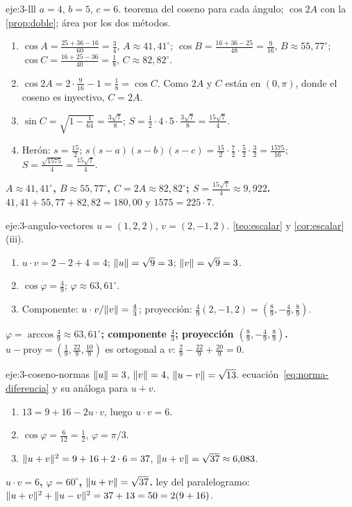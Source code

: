 \begin{solucion}{eje:3-lll}
\datos $a=4$, $b=5$, $c=6$.
\planteamiento teorema del coseno para cada ángulo; $\cos2A$ con la \cref{prop:doble}; área por los dos métodos.
\pasos
\begin{enumerate}[label=\arabic*.]
  \item $\cos A=\frac{25+36-16}{60}=\frac34$, $A\approx41{,}41^{\circ}$; $\cos B=\frac{16+36-25}{48}=\frac{9}{16}$, $B\approx55{,}77^{\circ}$; $\cos C=\frac{16+25-36}{40}=\frac18$, $C\approx82{,}82^{\circ}$.
  \item $\cos2A=2\cdot\frac{9}{16}-1=\frac18=\cos C$. Como $2A$ y $C$ están en $(0,\pi)$, donde el coseno es inyectivo, $C=2A$.
  \item $\sin C=\sqrt{1-\frac1{64}}=\frac{3\sqrt7}{8}$; $S=\frac12\cdot4\cdot5\cdot\frac{3\sqrt7}{8}=\frac{15\sqrt7}{4}$.
  \item Herón: $s=\frac{15}{2}$; $s(s-a)(s-b)(s-c)=\frac{15}{2}\cdot\frac72\cdot\frac52\cdot\frac32=\frac{1575}{16}$; $S=\frac{\sqrt{1575}}{4}=\frac{15\sqrt7}{4}$.
\end{enumerate}
\resultado \textbf{$A\approx41{,}41^{\circ}$, $B\approx55{,}77^{\circ}$, $C=2A\approx82{,}82^{\circ}$; $S=\frac{15\sqrt7}{4}\approx9{,}922$.}
\comprobacion $41{,}41+55{,}77+82{,}82=180{,}00$ y $1575=225\cdot7$.
\end{solucion}

\begin{solucion}{eje:3-angulo-vectores}
\datos $u=(1,2,2)$, $v=(2,-1,2)$.
\planteamiento \cref{teo:escalar} y \cref{cor:escalar}(iii).
\pasos
\begin{enumerate}[label=\arabic*.]
  \item $u\cdot v=2-2+4=4$; $\lVert u\rVert=\sqrt{9}=3$; $\lVert v\rVert=\sqrt9=3$.
  \item $\cos\varphi=\frac49$; $\varphi\approx63{,}61^{\circ}$.
  \item Componente: $u\cdot v/\lVert v\rVert=\frac43$; proyección: $\frac{4}{9}(2,-1,2)=(\frac89,-\frac49,\frac89)$.
\end{enumerate}
\resultado \textbf{$\varphi=\arccos\frac49\approx63{,}61^{\circ}$; componente $\frac43$; proyección $(\frac89,-\frac49,\frac89)$.}
\comprobacion $u-\mathrm{proy}=(\frac19,\frac{22}{9},\frac{10}{9})$ es ortogonal a $v$: $\frac29-\frac{22}{9}+\frac{20}{9}=0$.
\end{solucion}

\begin{solucion}{eje:3-coseno-normas}
\datos $\lVert u\rVert=3$, $\lVert v\rVert=4$, $\lVert u-v\rVert=\sqrt{13}$.
\planteamiento ecuación~\eqref{eq:norma-diferencia} y su análoga para $u+v$.
\pasos
\begin{enumerate}[label=\arabic*.]
  \item $13=9+16-2u\cdot v$, luego $u\cdot v=6$.
  \item $\cos\varphi=\frac{6}{12}=\frac12$, $\varphi=\pi/3$.
  \item $\lVert u+v\rVert^{2}=9+16+2\cdot6=37$, $\lVert u+v\rVert=\sqrt{37}\approx6{,}083$.
\end{enumerate}
\resultado \textbf{$u\cdot v=6$, $\varphi=60^{\circ}$, $\lVert u+v\rVert=\sqrt{37}$.}
\comprobacion ley del paralelogramo: $\lVert u+v\rVert^{2}+\lVert u-v\rVert^{2}=37+13=50=2(9+16)$.
\end{solucion}

